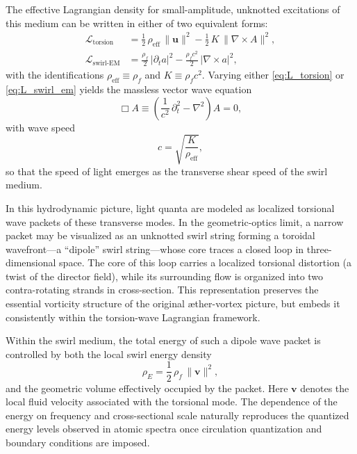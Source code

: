 \documentclass[10pt,reprint,aps,onecolumn,nofootinbib]{revtex4-2}
\newcommand{\rhof}{\rho_{\!f}}                           %
\newcommand{\rhoE}{\rho_{\!E}}                           %
\begin{document}
        The effective Lagrangian density for small-amplitude, unknotted excitations of this medium can be written in either of two equivalent forms:
        \begin{align}
            \mathcal{L}_{\text{torsion}}
            &=
            \frac{1}{2}\,\rho_{\text{eff}} \,\lVert \mathbf{u} \rVert^2
            - \frac{1}{2}\,K \,\lVert \nabla\times A \rVert^2,
            \label{eq:L_torsion}
            \\
            \mathcal{L}_{\text{swirl-EM}}
            &=
            \frac{\rhof}{2}\,\lvert \partial_t a \rvert^2
            - \frac{\rhof c^2}{2}\,\lvert \nabla\times a \rvert^2,
            \label{eq:L_swirl_em}
        \end{align}
        with the identifications \(\rho_{\text{eff}}\equiv\rhof\) and \(K \equiv \rhof c^2\).\cite{IskandaraniPhoton2025,IskandaraniHydrogenGS} Varying either \eqref{eq:L_torsion} or \eqref{eq:L_swirl_em} yields the massless vector wave equation
        \begin{equation}
            \Box A \equiv
            \left( \frac{1}{c^2}\,\partial_t^2 - \nabla^2 \right) A = 0,
        \end{equation}
        with wave speed
        \begin{equation}
            c = \sqrt{\frac{K}{\rho_{\text{eff}}}},
        \end{equation}
        so that the speed of light emerges as the transverse shear speed of the swirl medium.\cite{IskandaraniPhoton2025,IskandaraniHydrogenGS}

        In this hydrodynamic picture, light quanta are modeled as localized torsional wave packets of these transverse modes. In the geometric-optics limit, a narrow packet may be visualized as an unknotted swirl string forming a toroidal wavefront---a ``dipole'' swirl string---whose core traces a closed loop in three-dimensional space. The core of this loop carries a localized torsional distortion (a twist of the director field), while its surrounding flow is organized into two contra-rotating strands in cross-section. This representation preserves the essential vorticity structure of the original æther-vortex picture, but embeds it consistently within the torsion-wave Lagrangian framework.

        Within the swirl medium, the total energy of such a dipole wave packet is controlled by both the local swirl energy density
        \begin{equation}
            \rhoE = \frac{1}{2}\,\rhof \,\lVert \mathbf{v} \rVert^2,
        \end{equation}
        and the geometric volume effectively occupied by the packet. Here \(\mathbf{v}\) denotes the local fluid velocity associated with the torsional mode. The dependence of the energy on frequency and cross-sectional scale naturally reproduces the quantized energy levels observed in atomic spectra once circulation quantization and boundary conditions are imposed.\cite{IskandaraniHydrogenGS}
\end{document}

